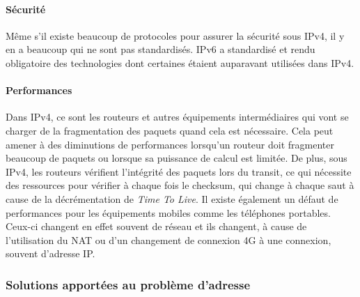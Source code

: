 \paragraph{Sécurité}
Même s'il existe beaucoup de protocoles pour assurer la sécurité sous IPv4, il
y en a beaucoup qui ne sont pas standardisés. IPv6 a standardisé et rendu
obligatoire des technologies dont certaines étaient auparavant utilisées dans
IPv4. 

\paragraph{Performances}
Dans IPv4, ce sont les routeurs et autres équipements
intermédiaires qui vont se charger de la fragmentation des paquets quand cela est
nécessaire. Cela peut amener à des diminutions de performances lorsqu'un
routeur doit fragmenter beaucoup de paquets ou lorsque sa puissance de calcul
est limitée. De plus, sous IPv4, les routeurs vérifient l'intégrité des paquets lors du
transit, ce qui nécessite des ressources pour vérifier à chaque fois le
checksum, qui change à chaque saut à cause de la décrémentation de {\it Time To
Live}.
\smallbreak
Il existe également un défaut de performances pour les équipements mobiles
comme les téléphones portables. Ceux-ci changent en effet souvent de réseau et
ils changent, à cause de l'utilisation du NAT ou d'un changement de connexion
4G à une connexion, souvent d'adresse IP. 


\subsubsection{Solutions apportées au problème d'adresse}

